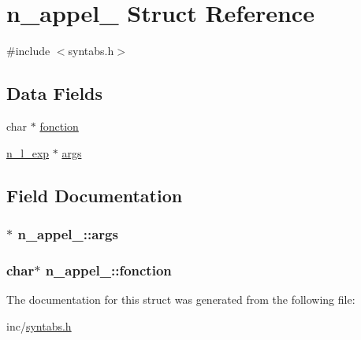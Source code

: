 \hypertarget{structn__appel__}{}\section{n\+\_\+appel\+\_\+ Struct Reference}
\label{structn__appel__}


{\ttfamily \#include $<$syntabs.\+h$>$}

\subsection*{Data Fields}
\begin{DoxyCompactItemize}
\item 
char $\ast$ \hyperlink{structn__appel___ac8332c3e7613db828d59a96d3c7bb136}{fonction}
\item 
\hyperlink{syntabs_8h_a3046944eb0074d1c280a6d656b3cbd65}{n\+\_\+l\+\_\+exp} $\ast$ \hyperlink{structn__appel___af5f5e017a60a50c67e0a3f82816ac2d4}{args}
\end{DoxyCompactItemize}


\subsection{Field Documentation}
\subsubsection[{\texorpdfstring{args}{args}}]{$\ast$ n\+\_\+appel\+\_\+\+::args}\hypertarget{structn__appel___af5f5e017a60a50c67e0a3f82816ac2d4}{}\label{structn__appel___af5f5e017a60a50c67e0a3f82816ac2d4}
\subsubsection[{\texorpdfstring{fonction}{fonction}}]{\setlength{\rightskip}{0pt plus 5cm}char$\ast$ n\+\_\+appel\+\_\+\+::fonction}\hypertarget{structn__appel___ac8332c3e7613db828d59a96d3c7bb136}{}\label{structn__appel___ac8332c3e7613db828d59a96d3c7bb136}


The documentation for this struct was generated from the following file\+:\begin{DoxyCompactItemize}
\item 
inc/\hyperlink{syntabs_8h}{syntabs.\+h}\end{DoxyCompactItemize}
